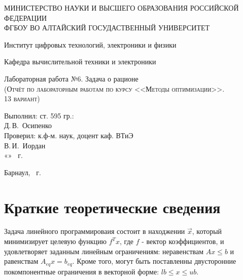 \documentclass[a4paper, 12pt]{article}
\begin{document}
\begin{titlepage}
  \begin{center}
    \MakeUppercase{Министерство науки и высшего образования Российской Федерации} \\
    \MakeUppercase{ФГБОУ ВО Алтайский госудаственный университет}
    \vspace{0.25cm}
    
	  Институт цифровых технологий, электроники и физики
    
    Кафедра вычислительной техники и электроники
    \vfill
    
    {\LARGE Лабораторная работа №6. Задача о рационе}\\[5mm]
    \textsc{(Отчёт по лабораторным работам по курсу <<Методы оптимизации>>. \\13 вариант)}
  \bigskip

\end{center}
\vfill

\newlength{\ML}
\hfill
\begin{minipage}{0.45\textwidth}
  Выполнил: ст. 595 гр.:\\
  \underline{\hspace{\ML}} Д.\,В.~Осипенко\\
  Проверил: к.ф-м. наук, доцент каф. ВТиЭ\\
  \underline{\hspace{\ML}} В.\,И.~Иордан\\
  «\underline{\hspace{0.7cm}}» \underline{\hspace{2cm}} \the\year~г.
\end{minipage}%
\vfill

\begin{center}
  Барнаул, \the\year~г.
\end{center}
\end{titlepage}

\newpage
\section{Краткие теоретические сведения}
Задача линейного программироваия состоит в находжении $\vec{x}$, который минимизирует целевую функцию $f^Tx$, где $f$ - вектор коэффициентов, и удовлетворяет заданным линейным ограничениям: неравенствам $Ax\leq b$ и равенствам $A_{eq}x = b_{eq}$. Кроме того, могут быть поставленны двусторонние покомпонентные ограничения в векторной форме: $lb\leq x \leq ub$.
\end{document}

